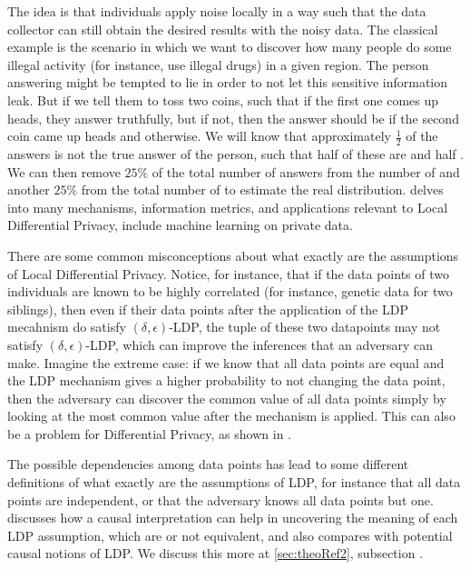 The idea is that individuals apply noise locally in a way such that the data collector can still obtain the desired results with the noisy data. The classical example is the scenario in which we want to discover how many people do some illegal activity (for instance, use illegal drugs) in a given region. The person answering might be tempted to lie in order to not let this sensitive information leak. But if we tell them to toss two coins, such that if the first one comes up heads, they answer truthfully, but if not, then the answer should be  if the second coin came up heads and  otherwise. We will know that approximately $\frac{1}{2}$ of the answers is not the true answer of the person, such that half of these are  and half . We can then remove $25\%$ of the total number of answers from the number of  and another $25\%$ from the total number of  to estimate the real distribution. \cite{xiong2020comprehensive} delves into many mechanisms, information metrics, and applications relevant to Local Differential Privacy, include machine learning on private data.

There are some common misconceptions about what exactly are the assumptions of Local Differential Privacy. Notice, for instance, that if the data points of two individuals are known to be highly correlated (for instance, genetic data for two siblings), then even if their data points after the application of the LDP mecahnism do satisfy $(\delta,\epsilon)$-LDP, the tuple of these two datapoints may not satisfy $(\delta,\epsilon)$-LDP, which can improve the inferences that an adversary can make. Imagine the extreme case: if we know that all data points are equal and the LDP mechanism gives a higher probability to not changing the data point, then the adversary can discover the common value of all data points simply by looking at the most common value after the mechanism is applied. This can also be a problem for Differential Privacy, as shown in \cite{liu2016dependence}. 

The possible dependencies among data points has lead to some different definitions of what exactly are the assumptions of LDP, for instance that all data points are independent, or that the adversary knows all data points but one. \cite{tschantz2020sok} discusses how a causal interpretation can help in uncovering the meaning of each LDP assumption, which are or not equivalent, and also compares with potential causal notions of LDP. We discuss this more at \ref{sec:theoRef2}, subsection .

